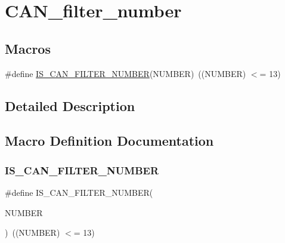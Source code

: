 \hypertarget{group___c_a_n__filter__number}{}\section{C\+A\+N\+\_\+filter\+\_\+number}
\label{group___c_a_n__filter__number}
\subsection*{Macros}
\begin{DoxyCompactItemize}
\item 
\#define \mbox{\hyperlink{group___c_a_n__filter__number_ga28d6c98a160d71059ed9a5973de2a4ef}{I\+S\+\_\+\+C\+A\+N\+\_\+\+F\+I\+L\+T\+E\+R\+\_\+\+N\+U\+M\+B\+ER}}(N\+U\+M\+B\+ER)~((N\+U\+M\+B\+ER) $<$= 13)
\end{DoxyCompactItemize}


\subsection{Detailed Description}


\subsection{Macro Definition Documentation}
\mbox{\label{group___c_a_n__filter__number_ga28d6c98a160d71059ed9a5973de2a4ef}} 
\subsubsection{\texorpdfstring{IS\_CAN\_FILTER\_NUMBER}{IS\_CAN\_FILTER\_NUMBER}}
{\footnotesize\ttfamily \#define I\+S\+\_\+\+C\+A\+N\+\_\+\+F\+I\+L\+T\+E\+R\+\_\+\+N\+U\+M\+B\+ER(\begin{DoxyParamCaption}\item[{}]{N\+U\+M\+B\+ER }\end{DoxyParamCaption})~((N\+U\+M\+B\+ER) $<$= 13)}

